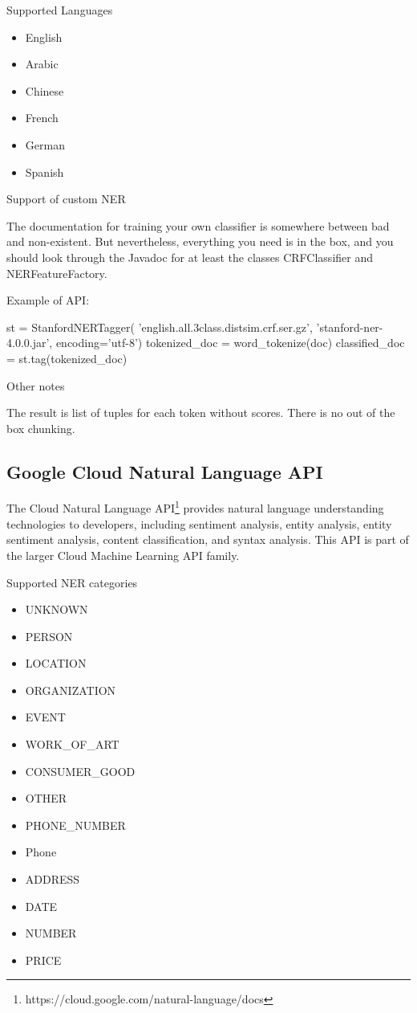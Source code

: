 \documentclass[conference]{IEEEtran}
\begin{document}
Supported Languages

\begin{itemize}
	\item English
	\item Arabic
	\item Chinese
	\item French
	\item German
	\item Spanish
\end{itemize}

Support of custom NER

The documentation for training your own classifier is somewhere between bad and non-existent. But nevertheless, everything you need is in the box, and you should look through the Javadoc for at least the classes CRFClassifier and NERFeatureFactory.

Example of API:

\begin{verbatimtab}[4]
st = StanfordNERTagger(
		'english.all.3class.distsim.crf.ser.gz', 
		'stanford-ner-4.0.0.jar',
		encoding='utf-8')
tokenized_doc = word_tokenize(doc)
classified_doc = st.tag(tokenized_doc)
\end{verbatimtab}

Other notes

The result is list of tuples for each token without scores. There is no out of the box chunking.

\subsection{Google Cloud Natural Language API}

The Cloud Natural Language API\footnote{https://cloud.google.com/natural-language/docs}  provides natural language understanding technologies to developers, including sentiment analysis, entity analysis, entity sentiment analysis, content classification, and syntax analysis. This API is part of the larger Cloud Machine Learning API family.

Supported NER categories

\begin{itemize}
	\item UNKNOWN
	\item PERSON
	\item LOCATION
	\item ORGANIZATION
	\item EVENT
	\item WORK\_OF\_ART
	\item CONSUMER\_GOOD
	\item OTHER
	\item PHONE\_NUMBER
	\item Phone
	\item ADDRESS
	\item DATE
	\item NUMBER
	\item PRICE
\end{itemize}
\end{document}
